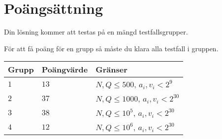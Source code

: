 \section*{Poängsättning}
Din lösning kommer att testas på en mängd testfallsgrupper.

För att få poäng för en grupp så måste du klara alla testfall i gruppen.

\noindent
\begin{tabular}{| l | l | l |}
\hline
Grupp & Poängvärde & Gränser \\ \hline
$1$    & $13$         & $N, Q \leq 500$, $a_i, v_i < 2^9$ \\ \hline
$2$    & $37$         & $N, Q \leq 1000$, $a_i, v_i < 2^{30}$ \\ \hline
$3$    & $38$         & $N, Q \leq 10^5$, $a_i, v_i < 2^{30}$ \\ \hline
$4$    & $12$         & $N, Q \leq 10^6$, $a_i, v_i < 2^{30}$ \\ \hline
\end{tabular}

